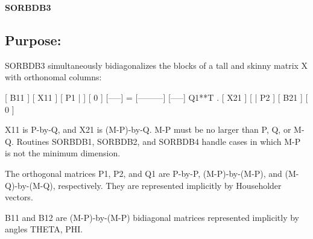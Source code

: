 {\bfseries S\+O\+R\+B\+D\+B3} 

\subsection*{Purpose\+: }

\begin{DoxyVerb} SORBDB3 simultaneously bidiagonalizes the blocks of a tall and skinny
 matrix X with orthonomal columns:

                            [ B11 ]
      [ X11 ]   [ P1 |    ] [  0  ]
      [-----] = [---------] [-----] Q1**T .
      [ X21 ]   [    | P2 ] [ B21 ]
                            [  0  ]

 X11 is P-by-Q, and X21 is (M-P)-by-Q. M-P must be no larger than P,
 Q, or M-Q. Routines SORBDB1, SORBDB2, and SORBDB4 handle cases in
 which M-P is not the minimum dimension.

 The orthogonal matrices P1, P2, and Q1 are P-by-P, (M-P)-by-(M-P),
 and (M-Q)-by-(M-Q), respectively. They are represented implicitly by
 Householder vectors.

 B11 and B12 are (M-P)-by-(M-P) bidiagonal matrices represented
 implicitly by angles THETA, PHI.\end{DoxyVerb}
 
